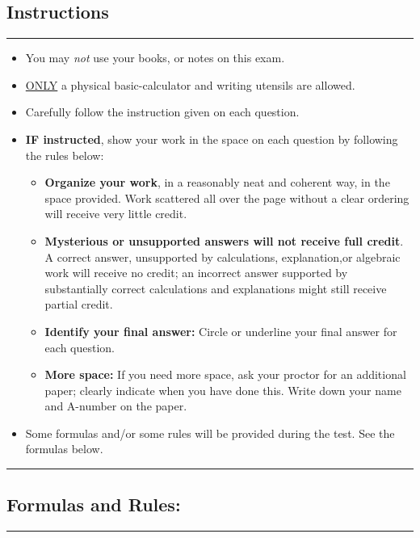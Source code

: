 \subsection*{Instructions}
{
\noindent
    \rule{\textwidth}{1pt}
    \vspace{1ex}
}
\begin{itemize}[leftmargin=*]
    \item You may \textit{not} use your books, or notes on this exam.
    \item \underline{ONLY} a physical basic-calculator and writing utensils are allowed.
    \item Carefully follow the instruction given on each question.
    \item \textbf{IF instructed}, show your work in the space on each question by following the rules below:
\begin{itemize}[leftmargin=*]
    \item \textbf{Organize your work}, in a reasonably neat and coherent way, in the space provided. Work scattered all over the page without a clear ordering will receive very little credit. 
    \item \textbf{Mysterious or unsupported answers will not receive full credit}.  A correct answer, unsupported by calculations, explanation,or algebraic work will receive no credit; an incorrect answer supported by substantially correct calculations and explanations might still receive partial credit.
    \item \textbf{Identify your final answer:} Circle or underline your final answer for each question. %
    \item \textbf{More space:} If you need more space, ask your proctor for an additional paper; clearly indicate when you have done this. Write down your name and A-number on the paper.
\end{itemize}
\item Some formulas and/or some rules will be provided during the test. See the formulas below.
\end{itemize}
{
\noindent
    \rule{\textwidth}{1pt}
    \vspace{1ex}
}
 \vspace{-0.25in}
\subsection*{Formulas and Rules:}
{
\noindent
    \rule{\textwidth}{1pt}
    \vspace{1ex}
}

